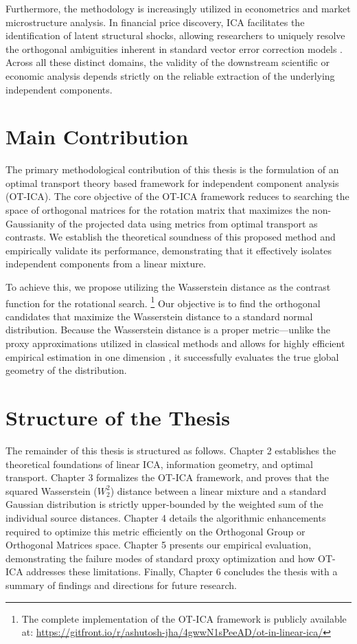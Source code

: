 \documentclass[12pt,a4paper,twoside,openany]{book}
\begin{document}
Furthermore, the methodology is increasingly utilized in econometrics and market microstructure analysis. 
In financial price discovery, ICA facilitates the identification of latent structural shocks, allowing researchers to 
uniquely resolve the orthogonal ambiguities inherent in standard vector error correction models \cite{zema2025}. 
Across all these distinct domains, the validity of the downstream scientific or economic analysis depends strictly on the 
reliable extraction of the underlying independent components.

\section{Main Contribution}

The primary methodological contribution of this thesis is the formulation of an optimal transport theory based framework for 
independent component analysis (OT-ICA). 
The core objective of the OT-ICA framework reduces to searching the space of orthogonal matrices for the rotation matrix 
that maximizes the non-Gaussianity of the projected data using metrics from optimal transport as contrasts. 
We establish the theoretical soundness of this proposed method and empirically validate its performance, 
demonstrating that it effectively isolates independent components from a linear mixture.

To achieve this, we propose utilizing the Wasserstein distance \cite{villani2003} as the contrast function for the rotational search.
\footnote{The complete implementation of the OT-ICA framework is publicly available at: \url{https://gitfront.io/r/ashutosh-jha/4gwwN1sPeeAD/ot-in-linear-ica/}} 
Our objective is to find the orthogonal candidates that maximize the Wasserstein distance to a standard normal distribution. 
Because the Wasserstein distance is a proper metric---unlike the proxy approximations utilized in classical methods 
and allows for highly efficient empirical estimation in one dimension \cite{villani2003}, it successfully evaluates 
the true global geometry of the distribution.

\section{Structure of the Thesis}

The remainder of this thesis is structured as follows. Chapter 2 establishes the theoretical foundations of linear ICA, information geometry, 
and optimal transport. Chapter 3 formalizes the OT-ICA framework, and proves that the squared Wasserstein ($W_2^2$) distance 
between a linear mixture and a standard Gaussian distribution is strictly upper-bounded by the weighted sum of the individual source distances. 
Chapter 4 details the algorithmic enhancements required to optimize this metric efficiently on the Orthogonal Group or Orthogonal Matrices space. 
Chapter 5 presents our empirical evaluation, demonstrating the failure modes of standard proxy optimization and how OT-ICA addresses these limitations. 
Finally, Chapter 6 concludes the thesis with a summary of findings and directions for future research.
\end{document}
